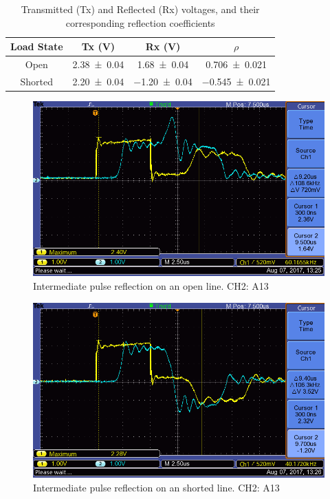 \documentclass[a4paper]{scrartcl}
\begin{document}
\begin{table}
    \centering
    \begin{tabular}{c | c | c | c}
        Load State & Tx (\si{\volt}) & Rx (\si{\volt}) & \(\rho\) \\
        \hline
        Open & \SI{2.38 \pm 0.04}{} & \SI{1.68 \pm 0.04}{} & \SI{0.706 \pm 0.021}{} \\
        Shorted & \SI{2.20 \pm 0.04}{} & \SI{-1.20 \pm 0.04}{} & \SI{-0.545 \pm 0.021}{}
    \end{tabular}
    \caption{Transmitted (Tx) and Reflected (Rx) voltages, and their corresponding reflection coefficients}
    \label{tab:reflection-coefficients}
\end{table}

\begin{figure}
    \centering
    \includegraphics[width = 15cm]{data/ALL0005/F0005TEK.png}
    \caption{Intermediate pulse reflection on an open line. CH2: A13}
    \label{fig:intermediate-open-line}
\end{figure}
\begin{figure}
    \centering
    \includegraphics[width = 15cm]{data/ALL0007/F0007TEK.png}
    \caption{Intermediate pulse reflection on an shorted line. CH2: A13}
    \label{fig:intermediate-shorted-line}
\end{figure}
\end{document}
